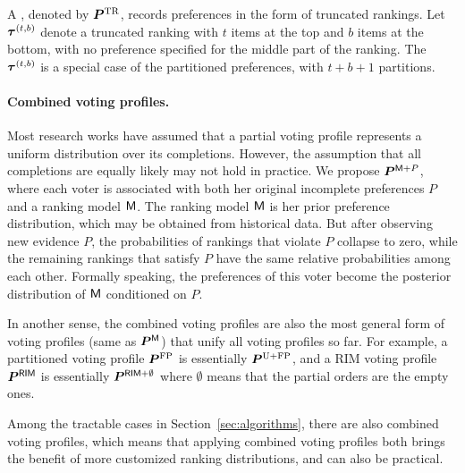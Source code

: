 A , denoted by $\bm{P}^{\text{TR}}$, records preferences in the form of truncated rankings.
Let $\bm{\tau}^{(t, b)}$ denote a truncated ranking with $t$ items at the top and $b$ items at the bottom, with no preference specified for the middle part of the ranking.
The $\bm{\tau}^{(t, b)}$ is a special case of the partitioned preferences, with $t+b+1$ partitions.

\paragraph{Combined voting profiles.}

Most research works have assumed that a partial voting profile represents a uniform distribution over its completions. However, the assumption that all completions are equally likely may not hold in practice.
We propose  $\bm{P}^{\mathsf{M}+P}$, where each voter is associated with both her original incomplete preferences $P$ and a ranking model $\mathsf{M}$.  The ranking model $\mathsf{M}$ is her prior preference distribution, which may be obtained from historical data.
But after observing new evidence $P$, the probabilities of rankings that violate $P$ collapse to zero, while the remaining rankings that satisfy $P$ have the same relative probabilities among each other.
Formally speaking, the preferences of this voter become the posterior distribution of $\mathsf{M}$ conditioned on $P$. 

In another sense, the combined voting profiles are also the most general form of voting profiles (same as $\bm{P}^{\mathsf{M}}$) that unify all voting profiles so far.
For example, a partitioned voting profile $\bm{P}^{\text{FP}}$ is essentially $\bm{P}^{\text{U+FP}}$, and a RIM voting profile $\bm{P}^{\mathsf{RIM}}$ is essentially $\bm{P}^{\mathsf{RIM}+\emptyset}$ where $\emptyset$ means that the partial orders are the empty ones.

Among the tractable cases in Section~\ref{sec:algorithms}, there are also combined voting profiles, which means that applying combined voting profiles both brings the benefit of more customized ranking distributions, and can also be practical.
